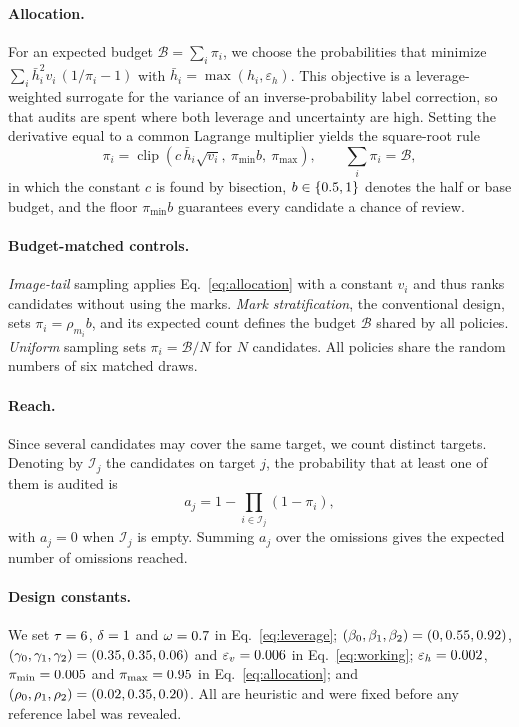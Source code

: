 \paragraph{Allocation.}
For an expected budget $\mathcal B=\sum_i\pi_i$, we choose the probabilities that minimize $\sum_i \bar h_i^2 v_i\,(1/\pi_i-1)$ with $\bar h_i=\max(h_i,\varepsilon_h)$. This objective is a leverage-weighted surrogate for the variance of an inverse-probability label correction, so that audits are spent where both leverage and uncertainty are high. Setting the derivative equal to a common Lagrange multiplier yields the square-root rule
\begin{equation}
 \pi_i=\operatorname{clip}\!\left(c\,\bar h_i\sqrt{v_i},\ \pi_{\min}b,\ \pi_{\max}\right),
 \qquad \textstyle\sum_i\pi_i=\mathcal B,
 \label{eq:allocation}
\end{equation}
in which the constant $c$ is found by bisection, $b\in\{0.5,1\}$ denotes the half or base budget, and the floor $\pi_{\min}b$ guarantees every candidate a chance of review.

\paragraph{Budget-matched controls.}
\emph{Image-tail} sampling applies Eq.~\eqref{eq:allocation} with a constant $v_i$ and thus ranks candidates without using the marks. \emph{Mark stratification}, the conventional design, sets $\pi_i=\rho_{m_i}b$, and its expected count defines the budget $\mathcal B$ shared by all policies. \emph{Uniform} sampling sets $\pi_i=\mathcal B/N$ for $N$ candidates. All policies share the random numbers of six matched draws.

\paragraph{Reach.}
Since several candidates may cover the same target, we count distinct targets. Denoting by $\mathcal I_j$ the candidates on target $j$, the probability that at least one of them is audited is
\begin{equation}
 a_j=1-\textstyle\prod_{i\in\mathcal I_j}(1-\pi_i),
 \label{eq:reach}
\end{equation}
with $a_j=0$ when $\mathcal I_j$ is empty. Summing $a_j$ over the omissions gives the expected number of omissions reached.

\paragraph{Design constants.}
We set $\tau=6$, $\delta=1$ and $\omega=0.7$ in Eq.~\eqref{eq:leverage}; $(\beta_0,\beta_1,\beta_2)=(0,0.55,0.92)$, $(\gamma_0,\gamma_1,\gamma_2)=(0.35,0.35,0.06)$ and $\varepsilon_v=0.006$ in Eq.~\eqref{eq:working}; $\varepsilon_h=0.002$, $\pi_{\min}=0.005$ and $\pi_{\max}=0.95$ in Eq.~\eqref{eq:allocation}; and $(\rho_0,\rho_1,\rho_2)=(0.02,0.35,0.20)$. All are heuristic and were fixed before any reference label was revealed.

